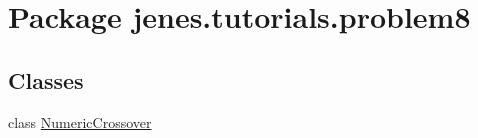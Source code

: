 \hypertarget{namespacejenes_1_1tutorials_1_1problem8}{\section{Package jenes.\-tutorials.\-problem8}
\label{namespacejenes_1_1tutorials_1_1problem8}
}
\subsection*{Classes}
\begin{DoxyCompactItemize}
\item 
class \hyperlink{classjenes_1_1tutorials_1_1problem8_1_1_numeric_crossover}{Numeric\-Crossover}
\end{DoxyCompactItemize}
